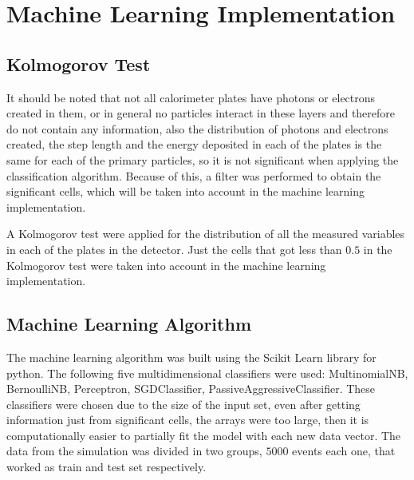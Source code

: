 \section{Machine Learning Implementation}

\subsection{Kolmogorov Test}

It should be noted that not all calorimeter plates have photons or electrons
created in them, or in general no particles interact in these layers and
therefore do not contain any information, also the distribution of photons and
electrons created, the step length and the energy deposited in each of the
plates is the same for each of the primary particles, so it is not significant
when applying the classification algorithm. Because of this, a filter was
performed to obtain the significant cells, which will be taken into account in
the machine learning implementation.

A Kolmogorov test were applied for the distribution of all the measured
variables in each of the plates in the detector. Just the cells that got less
than \(0.5\) in the Kolmogorov test were taken into account in the machine
learning implementation.

\subsection{Machine Learning Algorithm}

The machine learning algorithm was built using the Scikit Learn library for
python. The following five multidimensional classifiers were used:
MultinomialNB, BernoulliNB, Perceptron, SGDClassifier,
PassiveAggressiveClassifier. These classifiers were chosen due to the size of
the input set, even after getting information just from significant cells, the
arrays were too large, then it is computationally easier to partially fit the
model with each new data vector. The data from the simulation was divided in
two groups, \(5000\) events each one, that worked as train and test set
respectively.

